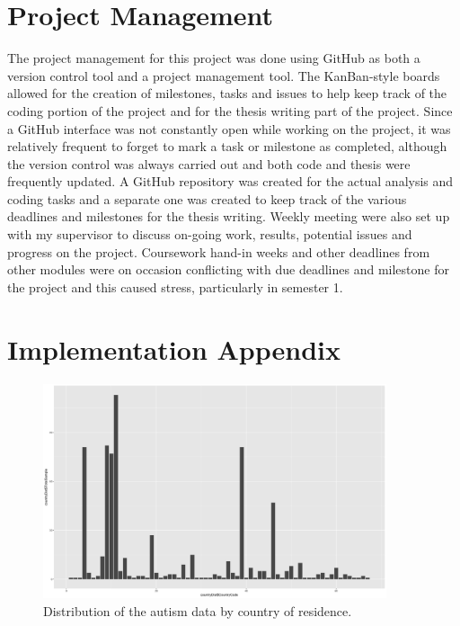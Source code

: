 \chapter{Project Management}
The project management for this project was done using GitHub as both a version control tool and a project management tool. The KanBan-style boards allowed for the creation of milestones, tasks and issues to help keep track of the coding portion of the project and for the thesis writing part of the project.\newline
Since a GitHub interface was not constantly open while working on the project, it was relatively frequent to forget to mark a task or milestone as completed, although the version control was always carried out and both code and thesis were frequently updated.\newline
A GitHub repository was created for the actual analysis and coding tasks and a separate one was created to keep track of  the various deadlines and milestones for the thesis writing.\newline
Weekly meeting were also set up with my supervisor to discuss on-going work, results, potential issues and progress on the project.\newline
Coursework hand-in weeks and other deadlines from other modules were on occasion conflicting with due deadlines and milestone for the project and this caused stress, particularly in semester 1.

\chapter{Implementation Appendix}

\begin{figure}[!htbp]
    \centering
    \includegraphics[width=0.9\textwidth]{ThesisTemplate/appendix/images/figure4_2b.png}
    \caption{Distribution of the autism data by country of residence.}
    \label{fig:Autism Distribution}
\end{figure}

